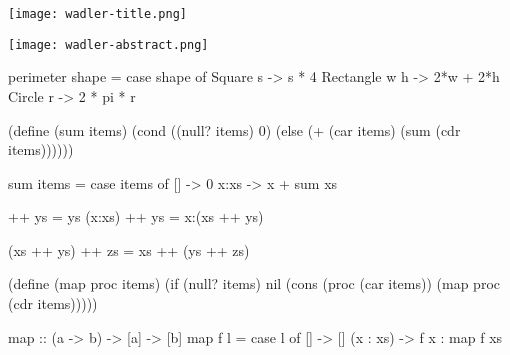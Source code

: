 \begin{frame}
\centering
\texttt{[image: wadler-title.png]}
\end{frame}


\begin{frame}
\centering
\texttt{[image: wadler-abstract.png]}
\end{frame}

\begin{frame}[fragile]
\begin{haskellcode}
perimeter shape =
  case shape of
    Square s      -> s * 4
    Rectangle w h -> 2*w + 2*h
    Circle r      -> 2 * pi * r
\end{haskellcode}
\end{frame}


\begin{frame}[fragile]
\begin{schemecode}
(define (sum items)
  (cond ((null? items) 0)
        (else (+ (car items) (sum (cdr items))))))
\end{schemecode}

\pnl

\begin{haskellcode}
sum items = case items of
  []   -> 0
  x:xs -> x + sum xs
\end{haskellcode}
\end{frame}


\begin{frame}[fragile]
\begin{haskellcode}
[] ++ ys      =  ys
(x:xs) ++ ys  =  x:(xs ++ ys)
\end{haskellcode}

\begin{haskellcode}
(xs ++ ys) ++ zs = xs ++ (ys ++ zs)
\end{haskellcode}
\end{frame}

\iffalse
\begin{frame}[fragile]
\begin{schemecode}
(define (map proc items)
  (if (null? items)
      nil
      (cons (proc (car items))
            (map proc (cdr items)))))
\end{schemecode}
\nl

\begin{haskellcode}
map :: (a -> b) -> [a] -> [b]
map f l =
  case l of
    []       -> []
    (x : xs) -> f x : map f xs
\end{haskellcode}
\end{frame}


